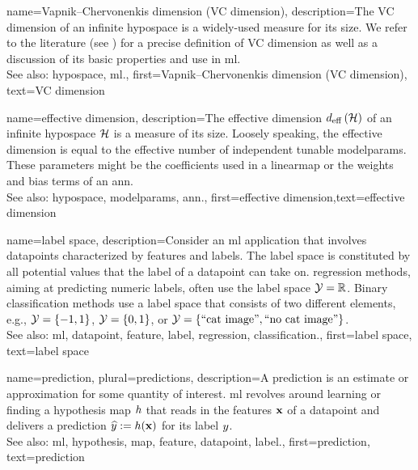 {name={Vapnik–Chervonenkis dimension (VC dimension)},
	description={The VC dimension of an infinite \gls{hypospace} is a widely-used measure 
		for its size. We refer to the literature (see \cite{ShalevMLBook}) for a precise definition of VC dimension 
		as well as a discussion of its basic properties and use in \gls{ml}.
					\\ 
		See also: \gls{hypospace}, \gls{ml}.},
	first={Vapnik–Chervonenkis dimension (VC dimension)},
	text={VC dimension}  
}

{name={effective dimension},
	description={The effective dimension $d_{\rm eff} \left( \mathcal{H} \right)$ of 
		an infinite \gls{hypospace} $\mathcal{H}$ is a measure of its size. Loosely speaking, the 
		effective dimension is equal to the effective number of independent tunable \gls{modelparams}. 
		These \glspl{parameter} might be the coefficients used in a \gls{linearmap} or the 
		\gls{weights} and \gls{bias} terms of an \gls{ann}.
					\\ 
		See also: \gls{hypospace}, \gls{modelparams}, \gls{ann}.},
	first={effective dimension},text={effective dimension}  
}

{name={label space},
	description={Consider an \gls{ml} application that involves \glspl{datapoint} characterized by \glspl{feature} 
		and \glspl{label}. The \gls{label} space is constituted by all potential values that the \gls{label} 
		of a \gls{datapoint} can take on. \Gls{regression} methods, aiming at predicting numeric \glspl{label}, often
		 use the \gls{label} space $\mathcal{Y} = \mathbb{R}$. Binary \gls{classification} methods use a \gls{label} space 
 		that consists of two different elements, e.g., $\mathcal{Y} =\{-1,1\}$, $\mathcal{Y}=\{0,1\}$, 
		or $\mathcal{Y} = \{ \mbox{``cat image''}, \mbox{``no cat image''} \}$.
					\\ 
		See also: \gls{ml}, \gls{datapoint}, \gls{feature}, \gls{label}, \gls{regression}, \gls{classification}.}, 
	first={label space},
	text={label space}  
}

{name={prediction}, plural={predictions},
	description={A prediction is an estimate or approximation for some 
		quantity of interest. \Gls{ml} revolves around learning or finding a \gls{hypothesis} \gls{map} $h$ 
		that reads in the \glspl{feature} ${\bf x}$ of a \gls{datapoint} and delivers a prediction 
		$\widehat{y} := h({\bf x})$ for its \gls{label} $y$.
					\\ 
		See also: \gls{ml}, \gls{hypothesis}, \gls{map}, \gls{feature}, \gls{datapoint}, \gls{label}.},
	first={prediction},
	text={prediction}  
}


